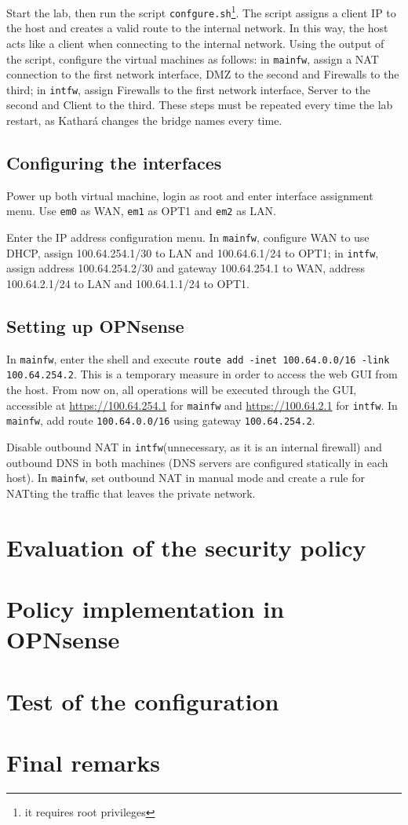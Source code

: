 \documentclass[draft]{homework}
\newcommand{\intfw}{\texttt{intfw}\xspace}
\newcommand{\kat}{Kathará\xspace}
\newcommand{\mainfw}{\texttt{mainfw}\xspace}
\newcommand{\opn}{OPNsense\xspace}
\begin{document}
    Start the lab, then run the script \texttt{confgure.sh}\footnote{it requires root privileges}. The script assigns a client IP to the host and creates a valid route to the internal network. In this way, the host acts like a client when connecting to the internal network. Using the output of the script, configure the virtual machines as follows: in \mainfw, assign a NAT connection to the first network interface, DMZ to the second and Firewalls to the third; in \intfw, assign Firewalls to the first network interface, Server to the second and Client to the third. These steps must be repeated every time the lab restart, as \kat changes the bridge names every time.
    
    \subsection{Configuring the interfaces}
    Power up both virtual machine, login as root and enter interface assignment menu. Use \texttt{em0} as WAN, \texttt{em1} as OPT1 and \texttt{em2} as LAN.
    
    Enter the IP address configuration menu. In \mainfw, configure WAN to use DHCP, assign 100.64.254.1/30 to LAN and 100.64.6.1/24 to OPT1; in \intfw, assign address 100.64.254.2/30 and gateway 100.64.254.1 to WAN, address 100.64.2.1/24 to LAN and 100.64.1.1/24 to OPT1.
    
    \subsection{Setting up \opn}
    In \mainfw, enter the shell and execute \texttt{route add -inet 100.64.0.0/16 -link \\ 100.64.254.2}. This is a temporary measure in order to access the web GUI from the host. From now on, all operations will be executed through the GUI, accessible at \url{https://100.64.254.1} for \mainfw and \url{https://100.64.2.1} for \intfw. In \mainfw, add route \texttt{100.64.0.0/16} using gateway \texttt{100.64.254.2}.
    
    Disable outbound NAT in \intfw (unnecessary, as it is an internal firewall) and outbound DNS in both machines (DNS servers are configured statically in each host). In \mainfw, set outbound NAT in manual mode and create a rule for NATting the traffic that leaves the private network.
    
    
    \section{Evaluation of the security policy}
    
    
    \section{Policy implementation in \opn}
    
    
    \section{Test of the configuration}
    
    \section{Final remarks}
\end{document}
